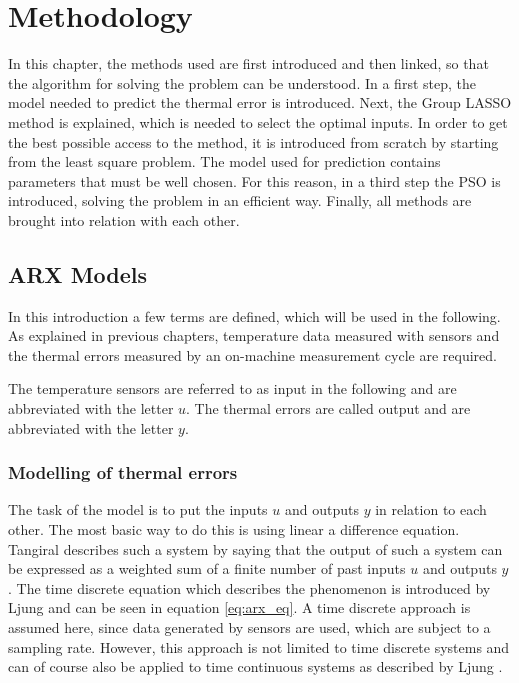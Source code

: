 \chapter{Methodology}
\label{chp:sample_chapter}

In this chapter, the methods used are first introduced and then linked, so that the algorithm for solving the problem can be understood. In a first step, the model needed to predict the thermal error is introduced. Next, the Group LASSO method is explained, which is needed to select the optimal inputs.  In order to get the best possible access to the method, it is introduced from scratch by starting from the least square problem.  
The model used for prediction contains parameters that must be well chosen. For this reason, in a third step the PSO is introduced, solving the problem in an efficient way. Finally, all methods are brought into relation with each other.



\section{ARX Models}
\label{sec:ARX_models}


In this introduction a few terms are defined, which will be used in the following. As explained in previous chapters, temperature data measured with sensors and the thermal errors measured by an on-machine measurement cycle are required.

The temperature sensors are referred to as input in the following and are abbreviated with the letter $u$. The thermal errors are called output and are abbreviated with the letter $y$. 

\subsection{Modelling of thermal errors}
\label{sec:modelling of errors}

The task of the model is to put the inputs $u$ and outputs $y$ in relation to each other. The most basic way to do this is using linear a difference equation. Tangiral \cite{Tangiral_2014} describes such a system by saying that the output of such a system can be expressed as a weighted sum of a finite number of past inputs $u$ and outputs $y$. The time discrete equation which describes the phenomenon is introduced by Ljung \cite{Ljung_1999} and can be seen in equation \ref{eq:arx_eq}. A time discrete approach is assumed here, since data generated by sensors are used, which are subject to a sampling rate. However, this approach is not limited to time discrete systems and can of course also be applied to time continuous systems as described by Ljung \cite{Ljung_1999}.

